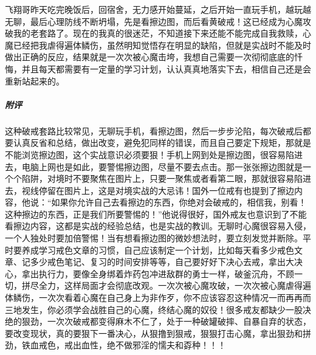 \begin{case}
    飞翔哥昨天吃完晚饭后，回宿舍，无力感开始蔓延，之后开始一直玩手机，越玩越无聊，最后心理防线不断坍塌，先是看擦边图，而后看黄破戒！这已经成为心魔攻破我的老套路了。现在的我真的很迷茫，不知道接下来还能不能完成自我救赎，心魔已经把我虐得遍体鳞伤，虽然明知觉悟存在明显的缺陷，但就是实战时不能及时做出正确的反应，结果就是一次次被心魔击垮，我想自己需要一次彻彻底底的忏悔，并且每天都需要有一定量的学习计划，认认真真地落实下去，相信自己还是会重新站起来的。
    \subparagraph{附评} 这种破戒套路比较常见，无聊玩手机，看擦边图，然后一步步沦陷，每次破戒后都要认真反省和总结，做出改变，避免犯同样的错误，而且自己要定下规矩，那就是不能浏览擦边图，这个实战意识必须要狠！手机上网到处是擦边图，很容易陷进去，电脑上网也是如此，要警惕擦边图，尽量不要去点击。那一张张擦边图就是一个个陷阱，对境时不要聚焦在图片上，只要一聚焦或者看第二眼，那就很容易陷进去，视线停留在图片上，这是对境实战的大忌讳！国外一位戒有也提到了擦边内容，他说：“如果你允许自己去看擦边的东西，你绝对会破戒的，相信我，别看！这种擦边的东西，正是我们所要警惕的！”他说得很好，国外戒友也意识到了不能看擦边内容，这都是实战的经验总结，也是实战的教训。无聊时心魔很容易入侵，一个人独处时要加倍警惕！当有想看擦边图的微妙想法时，要立刻发觉并断除。平时要养成学习戒色文章的习惯，自己应该制定一个计划，比如每天看多少戒色文章、记多少戒色笔记、复习的时间安排等等，自己要好好下决心去戒，拿出大决心，拿出执行力，要像全身绑着炸药包冲进敌群的勇士一样，破釜沉舟，不顾一切，拼尽全力，这样局面才会彻底改观。一次次被心魔攻破，一次次被心魔虐得遍体鳞伤，一次次看着心魔在自己身上为非作歹，你不应该容忍这种情况一而再再而三地发生，你必须学会战胜自己的心魔，终结心魔的奴役！很多戒友都缺少一股决绝的狠劲，一次次破戒都变得麻木不仁了，处于一种破罐破摔、自暴自弃的状态，要改变现状，真的要狠下一番决心，从狠撸到狠戒，狠狠打击心魔，拿出狠劲和拼劲，铁血戒色，戒出血性，绝不做邪淫的懦夫和孬种！！！
\end{case}

